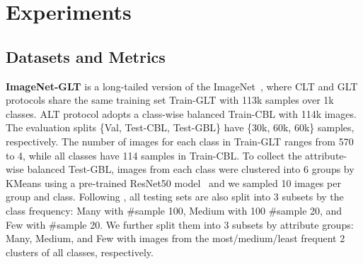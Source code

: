 \documentclass{article}
\begin{document}
 


\section{Experiments}
\label{sec:5}


\subsection{Datasets and Metrics} 



\noindent\textbf{ImageNet-GLT} is a long-tailed version of the ImageNet~\cite{russakovsky2015imagenet}, where CLT and GLT protocols share the same training set Train-GLT with 113k samples over 1k classes. ALT protocol adopts a class-wise balanced Train-CBL with 114k images. The evaluation splits \{Val, Test-CBL, Test-GBL\} have \{30k, 60k, 60k\} samples, respectively. The number of images for each class in Train-GLT ranges from 570 to 4, while all classes have 114 samples in Train-CBL. To collect the attribute-wise balanced Test-GBL, images from each class were clustered into 6 groups by KMeans using a pre-trained ResNet50 model~\cite{NEURIPS2019_9015} and we sampled 10 images per group and class. Following \cite{liu2019large,kang2019decoupling}, all testing sets are also split into 3 subsets by the class frequency: Many with \#sample  100, Medium with 100  \#sample  20, and Few with \#sample  20. We further split them into 3 subsets by attribute groups: Many, Medium, and Few with images from the most/medium/least frequent 2 clusters of all classes, respectively. 
\end{document}
